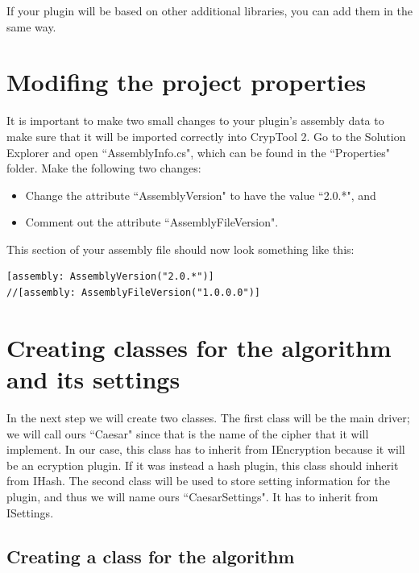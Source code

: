 \noindent If your plugin will be based on other additional libraries, you can add them in the same way.

\section{Modifing the project properties}
\label{sec:ModifyTheProjectProperties}

It is important to make two small changes to your plugin's assembly data to make sure that it will be imported correctly into CrypTool 2. Go to the Solution Explorer and open ``AssemblyInfo.cs", which can be found in the ``Properties" folder. Make the following two changes:

\begin{itemize}
	\item Change the attribute ``AssemblyVersion" to have the value ``2.0.*", and
	\item Comment out the attribute ``AssemblyFileVersion".
\end{itemize}

\noindent This section of your assembly file should now look something like this:

\begin{lstlisting}
[assembly: AssemblyVersion("2.0.*")]
//[assembly: AssemblyFileVersion("1.0.0.0")]
\end{lstlisting}

\section{Creating classes for the algorithm and its settings}
\label{sec:CreatingClassesForTheAlgorithmAndItsSettings}

In the next step we will create two classes. The first class will be the main driver; we will call ours ``Caesar" since that is the name of the cipher that it will implement. In our case, this class has to inherit from IEncryption because it will be an ecryption plugin. If it was instead a hash plugin, this class should inherit from IHash. The second class will be used to store setting information for the plugin, and thus we will name ours ``CaesarSettings". It has to inherit from ISettings.
\clearpage

\subsection{Creating a class for the algorithm}
\label{sec:CreatingAClassForTheAlgorithm}


